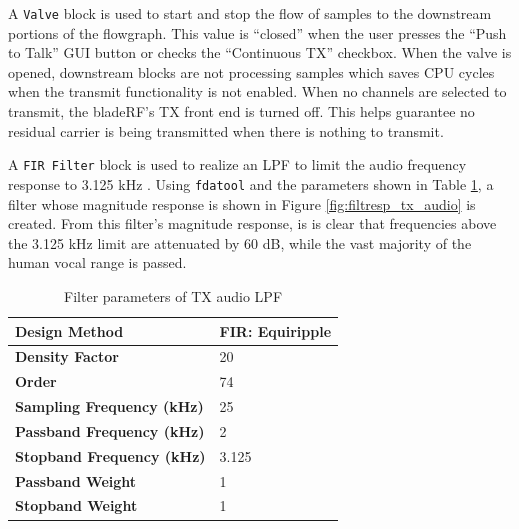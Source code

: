 A \texttt{Valve} block is used to start and stop the flow of samples to the
downstream portions of the flowgraph. This value is ``closed'' when the user
presses the ``Push to Talk'' \ac{GUI} button or checks the ``Continuous \ac{TX}'' checkbox.
When the valve is opened, downstream blocks are not processing samples which
saves CPU cycles when the transmit functionality is not enabled. When no channels
are selected to transmit, the bladeRF's \ac{TX} front end is turned off.  This
helps guarantee no residual carrier is being transmitted when there is nothing
to transmit.

A \texttt{\ac{FIR} Filter} block is used to realize an \ac{LPF} to limit the
audio frequency response to 3.125 kHz \cite{FCC_PART_95B}. Using
\texttt{fdatool} and the parameters shown in Table \ref{tab:filt_tx_audio},
a filter whose magnitude response is shown in Figure \ref{fig:filtresp_tx_audio}
is created.  From this filter's magnitude response, is is clear that
frequencies above the 3.125 kHz limit are attenuated by 60 dB, while the vast
majority of the human vocal range is passed.

\begin{table}[h]
  \centering
  \caption{Filter parameters of TX audio LPF}
  \label{tab:filt_tx_audio}
  \footnotesize
  \begin{tabular} {|l|l|}
    \hline
    \textbf{Design Method}              & FIR: Equiripple \\ \hline
    \textbf{Density Factor}             & 20              \\ \hline
    \textbf{Order}                      & 74              \\ \hline
    \textbf{Sampling Frequency (kHz)}   & 25              \\ \hline
    \textbf{Passband Frequency (kHz)}   & 2               \\ \hline
    \textbf{Stopband Frequency (kHz)}   & 3.125           \\ \hline
    \textbf{Passband Weight}            & 1               \\ \hline
    \textbf{Stopband Weight}            & 1               \\ \hline
  \end{tabular}
\end{table}

